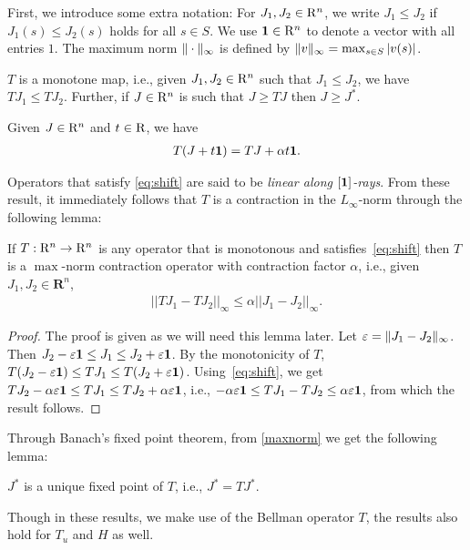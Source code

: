 First, we introduce some extra notation:
For $J_1,J_2\in \mathrm{R}^n$, we write $J_1\le J_2$ if $J_1(s)\le J_2(s)$ holds for all $s\in S$.
We use $\mathbf{1} \in \mathrm{R}^n$ to denote a vector with all entries $1$.
The maximum norm $\|\cdot\|_{\infty}$ is defined by $ \|v\|_{\infty} = \max_{s\in S} |v(s)|$.
\begin{lemma}\label{monotone}
$T$ is a monotone map, i.e., given $J_1,J_2 \in \mathrm{R}^n$ such that $J_1\leq J_2$, we have $T J_1\leq T J_2$. 
Further, if $J\in \mathrm{R}^n$ is such that $J\geq TJ$ then $J\geq J^*$. 
\end{lemma}
\begin{lemma}\label{shift}
Given $J\in \mathrm{R}^n$ and $t \in \mathrm{R}$, we have
\begin{align}\label{eq:shift}
T(J+t\one)=TJ+\alpha t\one.
\end{align}
\end{lemma}
Operators that satisfy \eqref{eq:shift} are said to be \emph{linear along $[\mathbf{1}]$-rays}.
From these result, it immediately follows that $T$ is a contraction in the $L_\infty$-norm through the following lemma:
\begin{lemma}\label{maxnorm}
If $T: \mathrm{R}^n \to \mathrm{R}^n$ is any operator that is monotonous and satisfies~\eqref{eq:shift} then 
$T$ is a $\max$-norm contraction operator with contraction factor $\alpha$, i.e., given $J_1, J_2 \in \mathbf{R}^n$,
\begin{align}
||TJ_1-TJ_2||_\infty\leq \alpha ||J_1-J_2||_\infty.
\end{align}
\end{lemma}
\begin{proof}
The proof is given as we will need this lemma later.
Let $\varepsilon = \|J_1 - J_2\|_\infty$. Then $J_2 - \varepsilon \mathbf{1} \le J_1 \le J_2 + \varepsilon \mathbf{1}$. By the monotonicity of $T$,
$T(J_2 - \varepsilon \mathbf{1}) \le T J_1 \le T(J_2 + \varepsilon \mathbf{1})$. Using~\eqref{eq:shift}, we get 
$TJ_2 - \alpha \varepsilon \mathbf{1} \le T J_1 \le TJ_2 + \alpha \varepsilon \mathbf{1}$, i.e., $-\alpha \varepsilon \mathbf{1} \le T J_1 - T J_2 \le \alpha \varepsilon \mathbf{1}$, from which the result follows.
\end{proof}
Through Banach's fixed point theorem, from \cref{maxnorm} we get the following lemma:
\begin{lemma}\label{uniquesol} 
$J^*$ is a unique fixed point of $T$, i.e., $J^*=TJ^*$.
\end{lemma}
Though in these results, we make use of the Bellman operator $T$, the results also hold for $T_u$ and $H$ as well.


